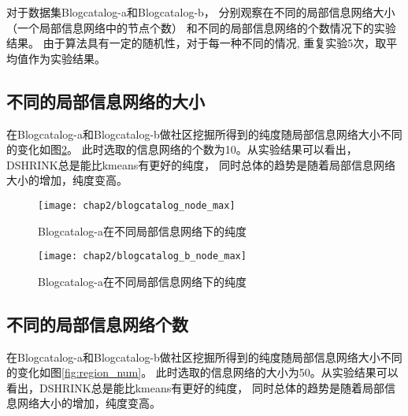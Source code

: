 对于数据集Blogcatalog-a和Blogcatalog-b，
分别观察在不同的局部信息网络大小（一个局部信息网络中的节点个数）
和不同的局部信息网络的个数情况下的实验结果。
由于算法具有一定的随机性，对于每一种不同的情况,
重复实验5次，取平均值作为实验结果。

\subsection{不同的局部信息网络的大小}
\label{sec:results_node_max}

在Blogcatalog-a和Blogcatalog-b做社区挖掘所得到的纯度随局部信息网络大小不同的变化如图\ref{fig:node_max:a}。
此时选取的信息网络的个数为10。从实验结果可以看出，DSHRINK总是能比kmeans有更好的纯度，
同时总体的趋势是随着局部信息网络大小的增加，纯度变高。

\begin{figure}
    \texttt{[image: chap2/blogcatalog\_node\_max]}
    \caption{Blogcatalog-a在不同局部信息网络下的纯度}
    \label{fig:node_max:a}
\end{figure}

\begin{figure}
    \texttt{[image: chap2/blogcatalog\_b\_node\_max]}
    \caption{Blogcatalog-a在不同局部信息网络下的纯度}
    \label{fig:node_max:a}
\end{figure}


\subsection{不同的局部信息网络个数}
\label{sec:results_region_num}

在Blogcatalog-a和Blogcatalog-b做社区挖掘所得到的纯度随局部信息网络大小不同的变化如图\ref{fig:region_num}。
此时选取的信息网络的大小为50。从实验结果可以看出，DSHRINK总是能比kmeans有更好的纯度，
同时总体的趋势是随着局部信息网络大小的增加，纯度变高。


